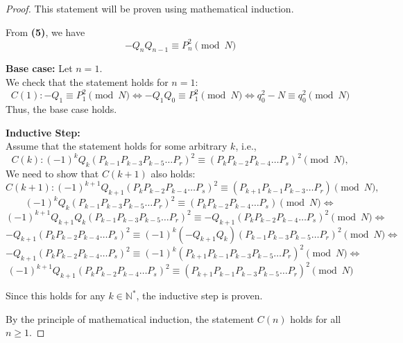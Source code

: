 \documentclass[12pt]{article}
\theoremstyle{definition}
\begin{document}
\begin{proof}

This statement will be proven using mathematical induction. 

From \textbf{(5)}, we have
\[-Q_nQ_{n-1} \equiv P_n^2 \pmod N\]

\textbf{Base case:} Let \(n = 1\). \\
We check that the statement holds for \(n = 1\):
\[
C(1): -Q_1 \equiv P_1^2 \pmod N \Longleftrightarrow -Q_1Q_0 \equiv P_1^2 \pmod N \Longleftrightarrow q_0^2-N \equiv q_0^2 \pmod N 
\]
Thus, the base case holds.

\vspace{1em}

\textbf{Inductive Step:} \\
Assume that the statement holds for some arbitrary \(k\), i.e.,
\[
C(k): (-1)^kQ_k(P_{k-1}P_{k-3}P_{k-5}\ldots P_r)^2 \equiv (P_kP_{k-2}P_{k-4} \ldots P_s) ^2 \pmod N,
\]
We need to show that \(C(k + 1)\) also holds:
\[
C(k + 1): (-1)^{k+1}Q_{k + 1}(P_kP_{k - 2}P_{k - 4}\ldots P_s)^2 \equiv (P_{k + 1}P_{k-1}P_{k - 3} \ldots P_r) \pmod N,
\]
\[
(-1)^kQ_k(P_{k-1}P_{k-3}P_{k-5}\ldots P_r)^2 \equiv (P_kP_{k-2}P_{k-4} \ldots P_s) \pmod N \Longleftrightarrow
\]
\[
(-1)^{k+1}Q_{k + 1}Q_k(P_{k - 1}P_{k - 3}P_{k - 5}\ldots P_r)^2 \equiv -Q_{k + 1}(P_kP_{k - 2}P_{k - 4} \ldots P_s) ^ 2 \pmod N \Longleftrightarrow
\]
\[
-Q_{k + 1}(P_kP_{k - 2}P_{k - 4} \ldots P_s) ^ 2 \equiv (-1)^{k}(-Q_{k + 1}Q_k)(P_{k - 1}P_{k - 3}P_{k - 5}\ldots P_r)^2 \pmod N \Longleftrightarrow
\]
\[
-Q_{k + 1}(P_kP_{k - 2}P_{k - 4} \ldots P_s) ^ 2 \equiv (-1)^k(P_{k + 1}P_{k - 1}P_{k - 3}P_{k - 5}\ldots P_r)^2  \pmod N \Longleftrightarrow
\]
\[
(-1)^{k + 1}Q_{k + 1}(P_kP_{k - 2}P_{k - 4} \ldots P_s) ^ 2 \equiv (P_{k + 1}P_{k - 1}P_{k - 3}P_{k - 5}\ldots P_r)^2  \pmod N 
\]

Since this holds for any \(k \in \mathbb{N^*}\), the inductive step is proven.

\vspace{1em}

By the principle of mathematical induction, the statement \(C(n)\) holds for all \(n \geq 1\).
\end{proof}
\end{document}
